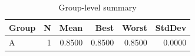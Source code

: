 \begin{table}[htbp]
\centering
\caption{Group-level summary}
\label{tab:group-summary}
\begin{tabular}{lrrrrr}
\toprule
\textbf{Group} & \textbf{N} & \textbf{Mean} & \textbf{Best} & \textbf{Worst} & \textbf{StdDev} \\
\midrule
A & 1 & 0.8500 & 0.8500 & 0.8500 & 0.0000 \\
\bottomrule
\end{tabular}
\end{table}